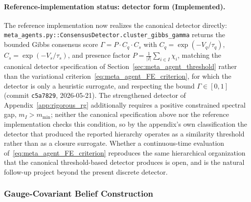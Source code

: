 \documentclass[11pt]{article}
\begin{document}
\paragraph{Reference-implementation status: detector form (Implemented).}
The reference implementation now realizes the canonical detector directly: \texttt{meta\_agents.py::ConsensusDetector.cluster\_gibbs\_gamma} returns the bounded Gibbs consensus score $\Gamma = P \cdot C_q \cdot C_s$ with $C_q = \exp(-V_q/\tau_q)$, $C_s = \exp(-V_s/\tau_s)$, and presence factor $P = \frac{1}{|I|}\sum_{i \in I}\chi_i$, matching the canonical detector specification of Section~\ref{sec:meta_agent_threshold} rather than the variational criterion~\eqref{eq:meta_agent_FE_criterion}, for which the detector is only a heuristic surrogate, and respecting the bound $\Gamma \in [0, 1]$ (commit \texttt{c5a7829}, 2026-05-21). The strengthened detector of Appendix~\ref{app:rigorous_rg} additionally requires a positive constrained spectral gap, $m_I > m_{\min}$; neither the canonical specification above nor the reference implementation checks this condition, so by the appendix's own classification the detector that produced the reported hierarchy operates as a similarity threshold rather than as a closure surrogate. Whether a continuous-time evaluation of~\eqref{eq:meta_agent_FE_criterion} reproduces the same hierarchical organization that the canonical threshold-based detector produces is open, and is the natural follow-up project beyond the present discrete detector.

\subsubsection{Gauge-Covariant Belief Construction}
\label{sec:meta_agent_state_construction}
\end{document}
